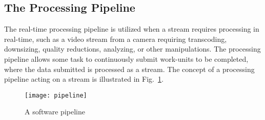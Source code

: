 \subsection{The Processing Pipeline}

The \gls{real-time} processing pipeline is utilized when a \gls{stream} requires
processing in real-time, such as a video \gls{stream} from a camera requiring
transcoding, downsizing, quality reductions, analyzing, or other
manipulations. The processing \gls{pipeline} allows some task to continuously
submit \glspl{work-unit} to be completed, where the data submitted is processed
as a \gls{stream}. The concept of a processing pipeline acting on a stream is
illustrated in Fig.~\ref{fig:pipeline}.

\begin{figure}
	\centering
	\texttt{[image: pipeline]}
	\caption{A software pipeline}
	\label{fig:pipeline}
\end{figure}
